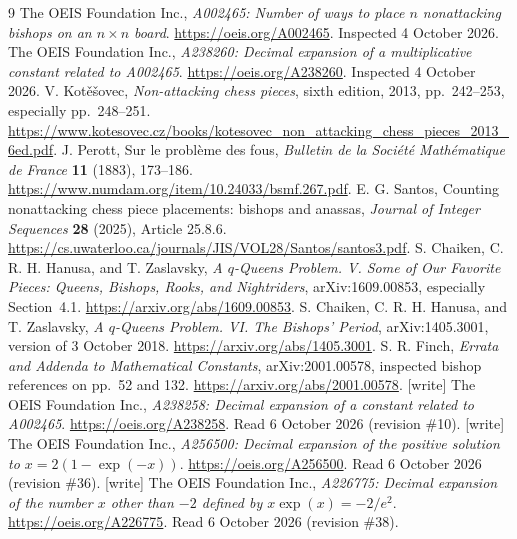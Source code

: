 \documentclass[11pt,letterpaper]{article}
\theoremstyle{remark}\newtheorem{remark}[theorem]{Remark}
\begin{document}
\begin{thebibliography}{9}
 The OEIS Foundation Inc., \emph{A002465: Number of ways to place $n$ nonattacking bishops on an $n\times n$ board}. \url{https://oeis.org/A002465}. Inspected 4 October 2026.
 The OEIS Foundation Inc., \emph{A238260: Decimal expansion of a multiplicative constant related to A002465}. \url{https://oeis.org/A238260}. Inspected 4 October 2026.
 V. Kot\v e\v sovec, \emph{Non-attacking chess pieces}, sixth edition, 2013, pp.~242--253, especially pp.~248--251. \url{https://www.kotesovec.cz/books/kotesovec_non_attacking_chess_pieces_2013_6ed.pdf}.
 J. Perott, Sur le probl\`eme des fous, \emph{Bulletin de la Soci\'et\'e Math\'ematique de France} \textbf{11} (1883), 173--186. \url{https://www.numdam.org/item/10.24033/bsmf.267.pdf}.
 E. G. Santos, Counting nonattacking chess piece placements: bishops and anassas, \emph{Journal of Integer Sequences} \textbf{28} (2025), Article 25.8.6. \url{https://cs.uwaterloo.ca/journals/JIS/VOL28/Santos/santos3.pdf}.
 S. Chaiken, C. R. H. Hanusa, and T. Zaslavsky, \emph{A $q$-Queens Problem. V. Some of Our Favorite Pieces: Queens, Bishops, Rooks, and Nightriders}, arXiv:1609.00853, especially Section~4.1. \url{https://arxiv.org/abs/1609.00853}.
 S. Chaiken, C. R. H. Hanusa, and T. Zaslavsky, \emph{A $q$-Queens Problem. VI. The Bishops' Period}, arXiv:1405.3001, version of 3 October 2018. \url{https://arxiv.org/abs/1405.3001}.
 S. R. Finch, \emph{Errata and Addenda to Mathematical Constants}, arXiv:2001.00578, inspected bishop references on pp.~52 and 132. \url{https://arxiv.org/abs/2001.00578}.
 [write] The OEIS Foundation Inc., \emph{A238258: Decimal expansion of a constant related to A002465}. \url{https://oeis.org/A238258}. Read 6 October 2026 (revision \#10).
 [write] The OEIS Foundation Inc., \emph{A256500: Decimal expansion of the positive solution to $x = 2(1-\exp(-x))$}. \url{https://oeis.org/A256500}. Read 6 October 2026 (revision \#36).
 [write] The OEIS Foundation Inc., \emph{A226775: Decimal expansion of the number $x$ other than $-2$ defined by $x\exp(x) = -2/e^2$}. \url{https://oeis.org/A226775}. Read 6 October 2026 (revision \#38).
\end{thebibliography}
\end{document}
